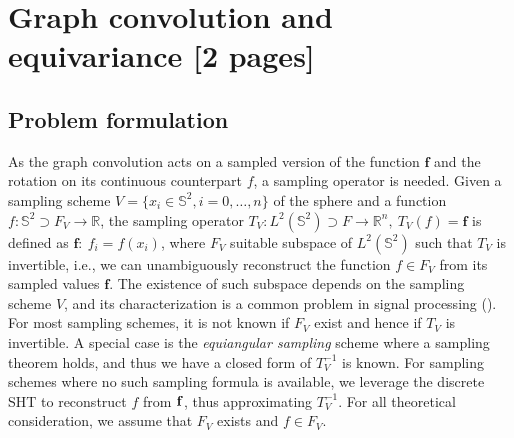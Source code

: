 \documentclass{article} %
\renewcommand{\b}[1]{{\bm{#1}}}   %
\newcommand{\nati}[1]{{\color[rgb]{.3,.5,.9}{#1}}}
\begin{document}

\section{Graph convolution and equivariance [2 pages]} \label{sec:equivariance}

\subsection{Problem formulation}
As the graph convolution acts on a sampled version of the function $\b{f}$ and the rotation on its continuous counterpart $f$, a sampling operator is needed.
Given a sampling scheme $V=\{x_i\in\mathbb S^2, i=0, \dots, n\}$ of the sphere and a function $f : \mathbb S^2 \supset F_V \to \mathbb R$, the sampling operator $T_V: L^2(\mathbb S^2) \supset F\to \mathbb R^n,\  T_V(f) = \b{f}$ is defined as $\b{f}:\ f_i=f(x_i)$, where $F_V$ suitable subspace of $L^2(\mathbb S^2)$ such that $T_V$ is invertible, i.e., we can unambiguously reconstruct the function $f\in F_V$ from its sampled values $\b{f}$.
The existence of such subspace depends on the sampling scheme $V$, and its characterization is a common problem in signal processing (\cite{driscoll1994Fouriersphere}).
For most sampling schemes, it is not known if $F_V$ exist and hence if $T_V$ is invertible. A special case is the \textit{equiangular sampling} scheme where a sampling theorem holds, and thus we have a closed form of $T_V^{-1}$ is known. %
For sampling schemes where no such sampling formula is available, we leverage the discrete SHT to reconstruct $f$ from $\bf{f}$, thus approximating $T_V^{-1}$.
For all theoretical consideration, we assume that $F_V$ exists and $f \in F_V$.
\end{document}
